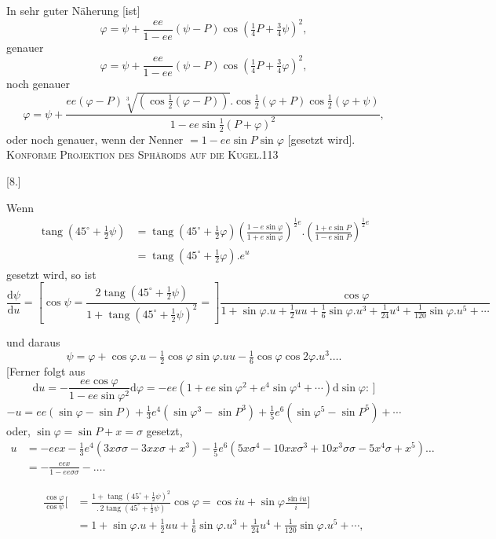 In sehr guter Näherung [ist]
\[
\varphi=\psi+\frac{ee}{1-ee}(\psi-P)\cos(\tfrac14P+\tfrac34\psi)^2,
\]
genauer
\[
\varphi=\psi+\frac{ee}{1-ee}(\psi-P)\cos(\tfrac14P+\tfrac34\varphi)^2,
\]
noch genauer
\[
\varphi=\psi+\frac{ee(\varphi-P)\sqrt[3]{(\cos\frac12(\varphi-P))}.\cos\frac12(\varphi+P)\cos\frac12(\varphi+\psi)}{1-ee\sin\frac12(P+\varphi)^2},
\]
oder noch genauer, wenn der Nenner $=1-ee\sin P\sin\varphi$ [gesetzt wird].
\clearpage
\noindent\mbox{}\hfill{\small\textsc{Konforme Projektion des Sphäroids auf die Kugel.}}\hfill113\par\bigskip
\begin{center}[8.]\end{center}
Wenn
\[
\begin{aligned}
\operatorname{tang}(45^\circ+\tfrac12\psi)&=\operatorname{tang}(45^\circ+\tfrac12\varphi)\left(\frac{1-e\sin\varphi}{1+e\sin\varphi}\right)^{\frac12e}.\left(\frac{1+e\sin P}{1-e\sin P}\right)^{\frac12e}\\
&=\operatorname{tang}(45^\circ+\tfrac12\varphi).e^u
\end{aligned}
\]
gesetzt wird, so ist
\begingroup\footnotesize
\[
\frac{\mathrm d\psi}{\mathrm du}=\left[\cos\psi=\frac{2\operatorname{tang}(45^\circ+\frac12\psi)}{1+\operatorname{tang}(45^\circ+\frac12\psi)^2}=\right]
\frac{\cos\varphi}{1+\sin\varphi.u+\frac12uu+\frac16\sin\varphi.u^3+\frac1{24}u^4+\frac1{120}\sin\varphi.u^5+\cdots}
\]
\par\endgroup
und daraus
\[
\psi=\varphi+\cos\varphi.u-\tfrac12\cos\varphi\sin\varphi.uu-\tfrac16\cos\varphi\cos2\varphi.u^3\ldots.
\]
[Ferner folgt aus
\[
\mathrm du=-\frac{ee\cos\varphi}{1-ee\sin\varphi^2}\mathrm d\varphi=-ee(1+ee\sin\varphi^2+e^4\sin\varphi^4+\cdots)\mathrm d\sin\varphi:\,]
\]
\[
-u=ee(\sin\varphi-\sin P)+\tfrac13e^4(\sin\varphi^3-\sin P^3)+\tfrac15e^6(\sin\varphi^5-\sin P^5)+\cdots
\]
oder, $\sin\varphi=\sin P+x=\sigma$ gesetzt,
\begingroup\small
\[
\begin{aligned}
u&=-eex-\tfrac13e^4(3x\sigma\sigma-3xx\sigma+x^3)-\tfrac15e^6(5x\sigma^4-10xx\sigma^3+10x^3\sigma\sigma-5x^4\sigma+x^5)\ldots\\
&=-\frac{eex}{1-ee\sigma\sigma}-\ldots.
\end{aligned}
\]
\par\endgroup
[Es ist]
\begingroup\small
\[
\begin{aligned}
\frac{\cos\varphi}{\cos\psi}\bigg[&=\frac{1+\operatorname{tang}(45^\circ+\frac12\psi)^2}{.\,2\operatorname{tang}(45^\circ+\frac12\psi)}\cos\varphi=\cos iu+\sin\varphi\frac{\sin iu}{i}\bigg]\\
&=1+\sin\varphi.u+\tfrac12uu+\tfrac16\sin\varphi.u^3+\tfrac1{24}u^4+\tfrac1{120}\sin\varphi.u^5+\cdots,
\end{aligned}
\]
